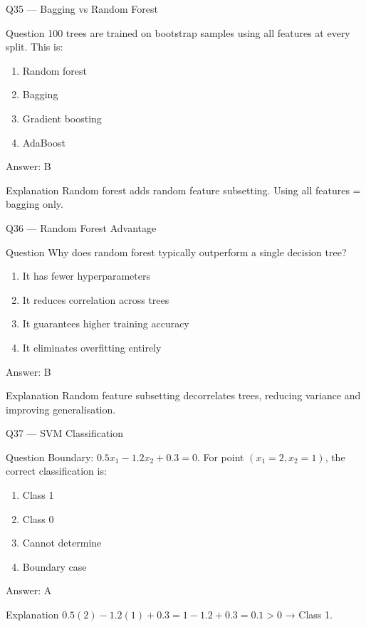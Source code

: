 \documentclass[aspectratio=169,8pt]{beamer}
\begin{document}
	\begin{frame}{Q35 --- Bagging vs Random Forest}
		\begin{block}{Question}
			100 trees are trained on bootstrap samples using all features at every split. This is:
		\end{block}
		\begin{enumerate}
			\item Random forest
			\item Bagging
			\item Gradient boosting
			\item AdaBoost
		\end{enumerate}
		\begin{exampleblock}{Answer: B}\end{exampleblock}
		\begin{block}{Explanation}
			Random forest adds random feature subsetting. Using all features = bagging only.
		\end{block}
	\end{frame}
	
	\begin{frame}{Q36 --- Random Forest Advantage}
		\begin{block}{Question}
			Why does random forest typically outperform a single decision tree?
		\end{block}
		\begin{enumerate}
			\item It has fewer hyperparameters
			\item It reduces correlation across trees
			\item It guarantees higher training accuracy
			\item It eliminates overfitting entirely
		\end{enumerate}
		\begin{exampleblock}{Answer: B}\end{exampleblock}
		\begin{block}{Explanation}
			Random feature subsetting decorrelates trees, reducing variance and improving generalisation.
		\end{block}
	\end{frame}
	
	\begin{frame}{Q37 --- SVM Classification}
		\begin{block}{Question}
			Boundary: $0.5x_1 - 1.2x_2 + 0.3 = 0$. For point $(x_1=2, x_2=1)$, the correct classification is:
		\end{block}
		\begin{enumerate}
			\item Class 1
			\item Class 0
			\item Cannot determine
			\item Boundary case
		\end{enumerate}
		\begin{exampleblock}{Answer: A}\end{exampleblock}
		\begin{block}{Explanation}
			$0.5(2) - 1.2(1) + 0.3 = 1 - 1.2 + 0.3 = 0.1 > 0$ → Class 1.
		\end{block}
	\end{frame}
	
\end{document}
